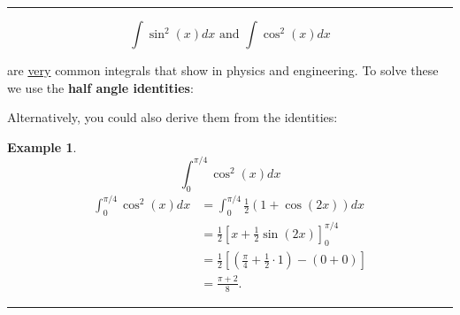 \documentclass[reqno]{amsart}
\newtheorem{eg}[lem]{Example}
\newcommand*\widefbox[1]{\fbox{\hspace{1em}#1\hspace{1em}}}
\numberwithin{equation}{section}
\begin{document}
\hrule
\vspace{3pc}

\[ \int \sin^2(x) dx \text{ and } \int \cos^2(x) dx \]

are \underline{very} common integrals that show in physics and engineering.  To solve these we use the {\bf half angle identities}:



Alternatively, you could also derive them from the identities:


\begin{eg}
\[ \int_0^{\pi/4} \cos^2(x) dx \]
\begin{align*}
\int_0^{\pi/4} \cos^2(x) dx &= \int_0^{\pi/4} \frac{1}{2}(1+\cos(2x)) dx \\
&= \frac{1}{2}\left[ x + \frac{1}{2}\sin(2x) \right]_0^{\pi/4} \\
&= \\
&= . 
\end{align*}
\end{eg}

\hrule
\vspace{3pc}
\end{document}
